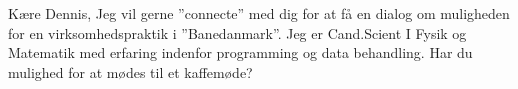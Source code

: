 \documentclass[10pt,a4paper]{report}
\begin{document}
Kære Dennis, Jeg vil gerne ”connecte” med dig for at få en dialog om muligheden for en virksomhedspraktik i ”Banedanmark”. Jeg er Cand.Scient I Fysik og Matematik med erfaring indenfor programming og data behandling. Har du mulighed for at mødes til et kaffemøde?
\end{document}
